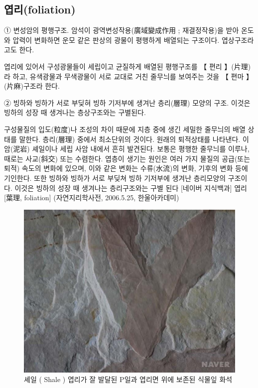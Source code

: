 \documentclass[12pt, a4paper, oneside]{book}
\begin{document}
	\subsection{엽리(foliation)}

① 변성암의 평행구조. 암석이 광역변성작용(廣域變成作用 ; 재결정작용)을 받아 온도와 압력이 변화하면  운모 같은 판상의 광물이 평행하게 배열되는 구조이다. 엽상구조라고도 한다.

엽리에 있어서 구성광물들이 세립이고 균질하게 배열된 평행구조를 【 편리 】(片理)라 하고, 유색광물과 무색광물이 서로 교대로 거친 줄무늬를 보여주는 것을 【 편마 】(片麻)구조라 한다.

② 빙하와 빙하가 서로 부딪혀 빙하 기저부에 생겨난 층리(層理) 모양의 구조. 이것은 빙하의 성장 때 생겨나는 층상구조와는 구별된다.




구성물질의 입도(粒度)나 조성의 차이 때문에 지층 중에 생긴 세밀한 줄무늬의 배열 상태를 말한다. 층리(層理) 중에서 최소단위의 것이다. 원래의 퇴적상태를 나타낸다. 이암(泥岩) 셰일이나 세립 사암 내에서 흔히 발견된다. 보통은 평행한 줄무늬를 이루나, 때로는 사교(斜交) 또는 수렴한다. 엽층이 생기는 원인은 여러 가지 물질의 공급(또는 퇴적) 속도의 변화에 있으며, 이와 같은 변화는 수류(水流)의 변화, 기후의 변화 등에 기인한다. 또한 빙하와 빙하가 서로 부딪쳐 빙하 기저부에 생겨난 층리모양의 구조이다. 이것은 빙하의 성장 때 생겨나는 층리구조와는 구별 된다
[네이버 지식백과] 엽리 [葉理, foliation] (자연지리학사전, 2006.5.25, 한울아카데미)


		\begin{figure}[h!]
		\caption{셰일 ( Shale ) 엽리가 잘 발달된 P일과 엽리면 위에 보존된 식물잎 화석}
		\includegraphics[width=1.0\textwidth]{./fig/fig-001.jpg}
		\end{figure}
\end{document}
